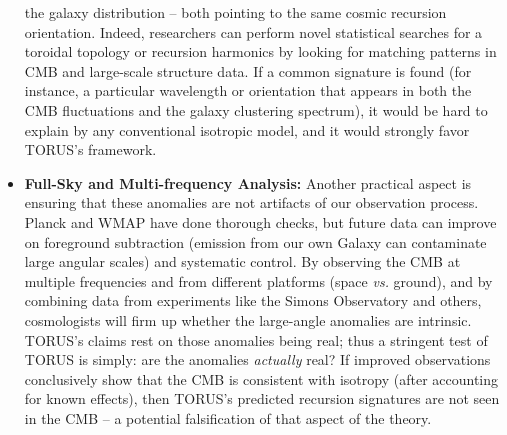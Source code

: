 \documentclass[]{article}
\begin{document}
\begin{itemize}
  the galaxy distribution -- both pointing to the same cosmic recursion
  orientation. Indeed, researchers can perform novel statistical
  searches for a toroidal topology or recursion harmonics by looking for
  matching patterns in CMB and large-scale structure data. If a common
  signature is found (for instance, a particular wavelength or
  orientation that appears in both the CMB fluctuations and the galaxy
  clustering spectrum), it would be hard to explain by any conventional
  isotropic model, and it would strongly favor TORUS's framework.
\item
  \textbf{Full-Sky and Multi-frequency Analysis:} Another practical
  aspect is ensuring that these anomalies are not artifacts of our
  observation process. Planck and WMAP have done thorough checks, but
  future data can improve on foreground subtraction (emission from our
  own Galaxy can contaminate large angular scales) and systematic
  control. By observing the CMB at multiple frequencies and from
  different platforms (space \emph{vs.} ground), and by combining data
  from experiments like the Simons Observatory and others, cosmologists
  will firm up whether the large-angle anomalies are intrinsic. TORUS's
  claims rest on those anomalies being real; thus a stringent test of
  TORUS is simply: are the anomalies \emph{actually} real? If improved
  observations conclusively show that the CMB is consistent with
  isotropy (after accounting for known effects), then TORUS's predicted
  recursion signatures are not seen in the CMB -- a potential
  falsification of that aspect of the theory.
\end{itemize}
\end{document}
